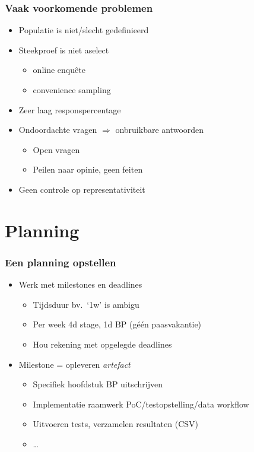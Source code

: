 \documentclass[aspectratio=169]{beamer}
\begin{document}
\begin{frame}
  \frametitle{Vaak voorkomende problemen}

  \begin{itemize}
    \item Populatie is niet/slecht gedefinieerd
    \item Steekproef is niet aselect
          \begin{itemize}
            \item online enquête
            \item convenience sampling
          \end{itemize}
    \item Zeer laag responspercentage
    \item Ondoordachte vragen $\Rightarrow$ onbruikbare antwoorden
          \begin{itemize}
            \item Open vragen
            \item Peilen naar opinie, geen feiten
          \end{itemize}
    \item Geen controle op representativiteit
  \end{itemize}

\end{frame}

\section{Planning}

\begin{frame}
  \frametitle{Een planning opstellen}

  \begin{itemize}
    \item Werk met milestones en deadlines
    \begin{itemize}
      \item Tijdsduur bv.\ `1w' is ambigu
      \item Per week 4d stage, 1d BP (géén paasvakantie)
      \item Hou rekening met opgelegde deadlines
    \end{itemize}
    \item Milestone = opleveren \textit{artefact}
    \begin{itemize}
      \item Specifiek hoofdstuk BP uitschrijven
      \item Implementatie raamwerk PoC/testopstelling/data workflow
      \item Uitvoeren tests, verzamelen resultaten (CSV)
      \item \ldots
    \end{itemize}
  \end{itemize}

\end{frame}
\end{document}

